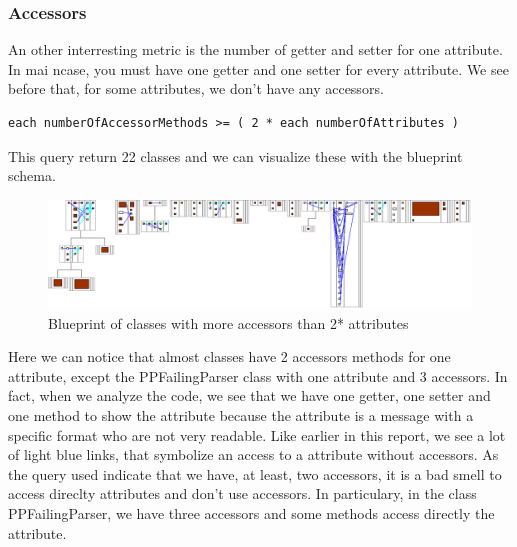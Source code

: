 \subsubsection{Accessors}
An other interresting metric is the number of getter and setter for one attribute.  In mai ncase, you must have one getter and one setter for every attribute.  We see before that, for some attributes, we don't have any accessors. \\
\begin{lstlisting}
each numberOfAccessorMethods >= ( 2 * each numberOfAttributes ) 
\end{lstlisting}
This query return 22 classes and we can visualize these with the blueprint schema.\\
\begin{figure}[ht]
\centering
\label{more_access_blueprint}
\includegraphics[scale=0.35]{more_access_blueprint.png}
\caption{Blueprint of classes with more accessors than 2* attributes}
\end{figure}
Here we can notice that almost classes have 2 accessors methods for one attribute, except the PPFailingParser class with one attribute and 3 accessors.  In fact, when we analyze the code, we see that we have one getter, one setter and one method to show the attribute because the attribute is a message with a specific format who are not very readable.  Like earlier in this report, we see a lot of light blue links, that symbolize an access to a attribute without accessors. As the query used indicate that we have, at least, two accessors, it is a bad smell to access direclty attributes and don't use accessors.  In particulary, in the class PPFailingParser, we have three accessors and some methods access directly the attribute.\\

